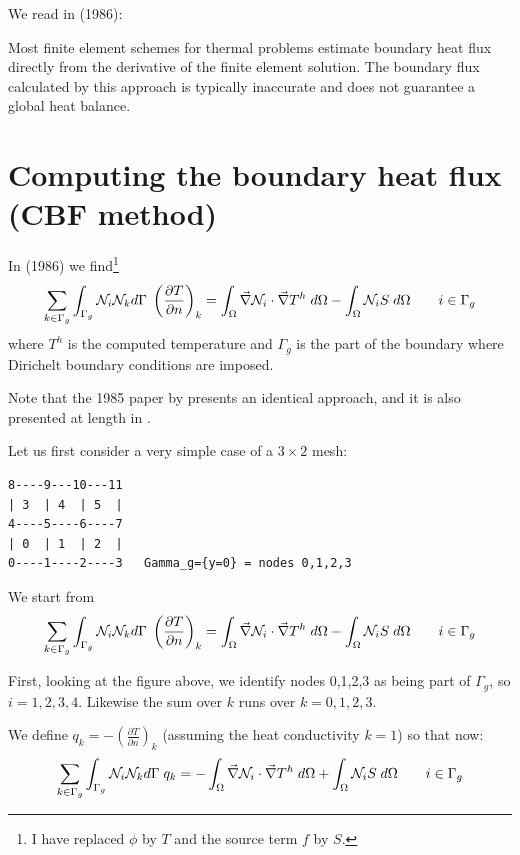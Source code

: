 We read in \textcite{mizu86} (1986):
\begin{displayquote}
{\color{MidnightBlue}
Most finite element schemes for thermal problems estimate boundary heat flux directly from the
derivative of the finite element solution. The boundary flux calculated by this approach is typically
inaccurate and does not guarantee a global heat balance.}
\end{displayquote}

\section*{Computing the boundary heat flux (CBF method)}

In \textcite{mizu86} (1986) we find\footnote{I have replaced $\phi$ by $T$ and 
the source term $f$ by $S$.}
\[
\sum_{k \in \Gamma_g} \int_{\Gamma_g} {\mathcal{N}}_i {\mathcal{N}}_k d\Gamma \; 
\left(
\frac{\partial T}{\partial n}
\right)_k
=
\int_\Omega \vec\nabla {\mathcal{N}}_i \cdot \vec\nabla T^h \; d\Omega
- \int_\Omega {\mathcal{N}}_i S \; d\Omega
\qquad
i \in \Gamma_g
\]
where $T^h$ is the computed temperature and $\Gamma_g$ is the part of the 
boundary where Dirichelt boundary conditions are imposed.

Note that the 1985 paper by \textcite{cacs85} presents an identical approach, 
and it is also presented at length in \textcite{grls87}.

Let us first consider a very simple case of a $3\times 2$ mesh:

\begin{verbatim}
8----9---10---11
| 3  | 4  | 5  |
4----5----6----7
| 0  | 1  | 2  |
0----1----2----3   Gamma_g={y=0} = nodes 0,1,2,3
\end{verbatim}



We start from 
\begin{equation}
\sum_{k \in \Gamma_g} \int_{\Gamma_g} {\mathcal{N}}_i {\mathcal{N}}_k d\Gamma \; 
\left(
\frac{\partial T}{\partial n}
\right)_k
=
\int_\Omega \vec\nabla {\mathcal{N}}_i \cdot \vec\nabla T^h \; d\Omega
- \int_\Omega {\mathcal{N}}_i S \; d\Omega
\qquad
i \in \Gamma_g
\label{eq:mizu1}
\end{equation}

First, looking at the figure above, we identify nodes 0,1,2,3 as 
being part of $\Gamma_g$, so $i=1,2,3,4$. Likewise the sum over $k$ 
runs over $k=0,1,2,3$.

We define $q_k= -\left(\frac{\partial T}{\partial n}\right)_k$ 
(assuming the heat conductivity $k=1$) 
so that now:
\[
\sum_{k \in \Gamma_g} \int_{\Gamma_g} {\mathcal{N}}_i {\mathcal{N}}_k d\Gamma \; 
q_k
=
-\int_\Omega \vec\nabla {\mathcal{N}}_i \cdot \vec\nabla T^h \; d\Omega
+ \int_\Omega {\mathcal{N}}_i S \; d\Omega
\qquad
i \in \Gamma_g
\]


